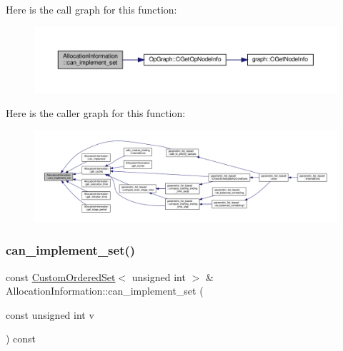 Here is the call graph for this function\+:
\nopagebreak
\begin{figure}[H]
\begin{center}
\leavevmode
\includegraphics[width=350pt]{d7/d79/classAllocationInformation_a070bb1c2f0116dd33cca59346ee57372_cgraph}
\end{center}
\end{figure}
Here is the caller graph for this function\+:
\nopagebreak
\begin{figure}[H]
\begin{center}
\leavevmode
\includegraphics[width=350pt]{d7/d79/classAllocationInformation_a070bb1c2f0116dd33cca59346ee57372_icgraph}
\end{center}
\end{figure}
\mbox{\label{classAllocationInformation_aa232c85d830198cd536e5c38135f75b8}} 
\subsubsection{\texorpdfstring{can\+\_\+implement\+\_\+set()}{can\_implement\_set()}\hspace{0.1cm}{\footnotesize\ttfamily [2/2]}}
{\footnotesize\ttfamily const \hyperlink{classCustomOrderedSet}{Custom\+Ordered\+Set}$<$ unsigned int $>$ \& Allocation\+Information\+::can\+\_\+implement\+\_\+set (\begin{DoxyParamCaption}\item[{const unsigned int}]{v }\end{DoxyParamCaption}) const}



